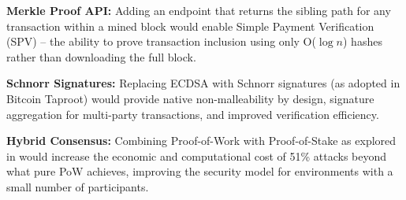 \documentclass[12pt,a4paper]{report}
\begin{document}
\textbf{Merkle Proof API:} Adding an endpoint that returns the sibling path for any
transaction within a mined block would enable Simple Payment Verification (SPV) -- the
ability to prove transaction inclusion using only O($\log n$) hashes rather than
downloading the full block.

\textbf{Schnorr Signatures:} Replacing ECDSA with Schnorr signatures (as adopted in
Bitcoin Taproot) would provide native non-malleability by design, signature aggregation
for multi-party transactions, and improved verification efficiency.

\textbf{Hybrid Consensus:} Combining Proof-of-Work with Proof-of-Stake as explored in
\cite{mdpi2021hybrid} would increase the economic and computational cost of 51\% attacks
beyond what pure PoW achieves, improving the security model for environments with a
small number of participants.
\end{document}
